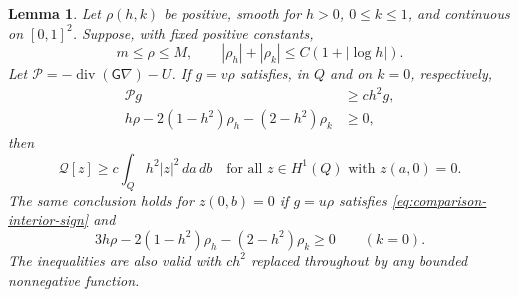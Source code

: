 \documentclass[reqno,11pt]{amsart}
\numberwithin{equation}{section}
\newtheorem{lemma}[theorem]{Lemma}
\theoremstyle{remark}
\begin{document}
\begin{lemma}\label{lem:logarithmic-robin-comparison}
Let $\rho(h,k)$ be positive, smooth for $h>0$, $0\leq k\leq1$,
and continuous on $[0,1]^2$.  Suppose, with fixed positive constants,
\begin{equation}\label{eq:comparison-log-growth}
 m\leq\rho\leq M,\qquad
 |\rho_h|+|\rho_k|\leq C(1+|\log h|).
\end{equation}
Let $\mathcal P=-\operatorname{div}(\mathsf G\nabla)-U$.
If $g=v\rho$ satisfies, in $Q$ and on $k=0$, respectively,
\begin{align}
 \mathcal P g&\geq c h^2g,\label{eq:comparison-interior-sign}\\
 h\rho-2(1-h^2)\rho_h-(2-h^2)\rho_k&\geq0,
 \label{eq:comparison-v-robin}
\end{align}
then
\[
 \mathcal Q[z]\geq c\int_Qh^2|z|^2\,da\,db
 \quad\text{for all }z\in H^1(Q)\text{ with }z(a,0)=0.
\]
The same conclusion holds for $z(0,b)=0$ if $g=u\rho$
satisfies \eqref{eq:comparison-interior-sign} and
\begin{equation}\label{eq:comparison-u-robin}
 3h\rho-2(1-h^2)\rho_h-(2-h^2)\rho_k\geq0
 \qquad(k=0).
\end{equation}
The inequalities are also valid with $c h^2$ replaced throughout by
any bounded nonnegative function.
\end{lemma}
\end{document}

